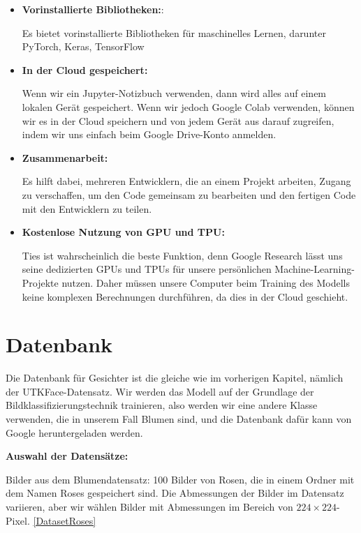 \begin{itemize}  
	\item \textbf{Vorinstallierte Bibliotheken:}:
	
	Es bietet vorinstallierte Bibliotheken für maschinelles Lernen, darunter PyTorch, Keras, TensorFlow
	
	\item \textbf{In der Cloud gespeichert:}
	
	Wenn wir ein Jupyter-Notizbuch verwenden, dann wird alles auf einem lokalen Gerät gespeichert. Wenn wir jedoch Google Colab verwenden, können wir es in der Cloud speichern und von jedem Gerät aus darauf zugreifen, indem wir uns einfach beim Google Drive-Konto anmelden.
	
	\item \textbf{Zusammenarbeit:}
	
	Es hilft dabei, mehreren Entwicklern, die an einem Projekt arbeiten, Zugang zu verschaffen, um den Code gemeinsam zu bearbeiten und den fertigen Code mit den Entwicklern zu teilen.
	
	\item \textbf{Kostenlose Nutzung von GPU und TPU:}
	
	Ties ist wahrscheinlich die beste Funktion, denn Google Research lässt uns seine dedizierten GPUs und TPUs für unsere persönlichen Machine-Learning-Projekte nutzen. Daher müssen unsere Computer beim Training des Modells keine komplexen Berechnungen durchführen, da dies in der Cloud geschieht.
	
\end{itemize}


\section{Datenbank}

Die Datenbank für Gesichter ist die gleiche wie im vorherigen Kapitel, nämlich der UTKFace-Datensatz. Wir werden das Modell auf der Grundlage der Bildklassifizierungstechnik trainieren, also werden wir eine andere Klasse verwenden, die in unserem Fall Blumen sind, und die Datenbank dafür kann von Google heruntergeladen werden.

\bigskip

\textbf{Auswahl der Datensätze:} 

Bilder aus dem Blumendatensatz: 100 Bilder von Rosen, die in einem Ordner mit dem Namen \glqq Roses\grqq{} gespeichert sind. Die Abmessungen der Bilder im Datensatz variieren, aber wir wählen Bilder mit Abmessungen im Bereich von $224 \times 224$-Pixel. \ref{DatasetRoses}

